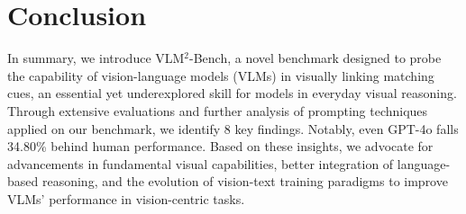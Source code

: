 \section{Conclusion}
In summary, we introduce VLM$^2$-Bench, a novel benchmark designed to probe the capability of vision-language models (VLMs) in visually linking matching cues, an essential yet underexplored skill for models in everyday visual reasoning. 
Through extensive evaluations and further analysis of prompting techniques applied on our benchmark, we identify 8 key findings. Notably, even GPT-4o falls 34.80\% behind human performance. Based on these insights, we advocate for advancements in fundamental visual capabilities, better integration of language-based reasoning, and the evolution of vision-text training paradigms to improve VLMs' performance in vision-centric tasks.
